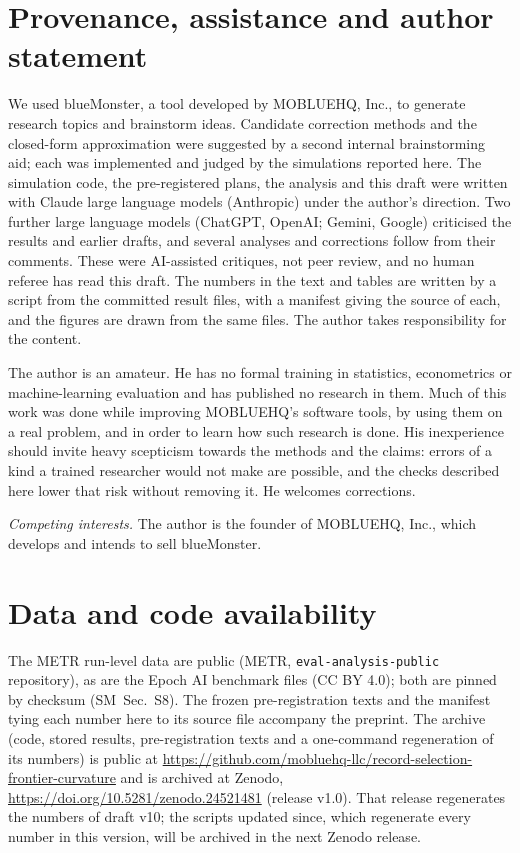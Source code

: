 \documentclass[aps,pre,twocolumn,superscriptaddress,nofootinbib,10pt]{revtex4-2}
\newcommand{\SM}{SM}
\begin{document}
\section{Provenance, assistance and author statement}
We used blueMonster, a tool developed by MOBLUEHQ, Inc., to generate research topics and brainstorm ideas. Candidate correction methods and the closed-form approximation were suggested by a second internal brainstorming aid; each was implemented and judged by the simulations reported here. The simulation code, the pre-registered plans, the analysis and this draft were written with Claude large language models (Anthropic) under the author's direction. Two further large language models (ChatGPT, OpenAI; Gemini, Google) criticised the results and earlier drafts, and several analyses and corrections follow from their comments. These were AI-assisted critiques, not peer review, and no human referee has read this draft. The numbers in the text and tables are written by a script from the committed result files, with a manifest giving the source of each, and the figures are drawn from the same files. The author takes responsibility for the content.

The author is an amateur. He has no formal training in statistics, econometrics or machine-learning evaluation and has published no research in them. Much of this work was done while improving MOBLUEHQ's software tools, by using them on a real problem, and in order to learn how such research is done. His inexperience should invite heavy scepticism towards the methods and the claims: errors of a kind a trained researcher would not make are possible, and the checks described here lower that risk without removing it. He welcomes corrections.

\emph{Competing interests.} The author is the founder of MOBLUEHQ, Inc., which develops and intends to sell blueMonster.

\section*{Data and code availability}
The METR run-level data are public (METR, \texttt{eval-analysis-public} repository), as are the Epoch AI benchmark files (CC BY 4.0); both are pinned by checksum (\SM\ Sec.~S8). The frozen pre-registration texts and the manifest tying each number here to its source file accompany the preprint. The archive (code, stored results, pre-registration texts and a one-command regeneration of its numbers) is public at \url{https://github.com/mobluehq-llc/record-selection-frontier-curvature} and is archived at Zenodo, \url{https://doi.org/10.5281/zenodo.24521481} (release v1.0). That release regenerates the numbers of draft v10; the scripts updated since, which regenerate every number in this version, will be archived in the next Zenodo release.


\end{document}
